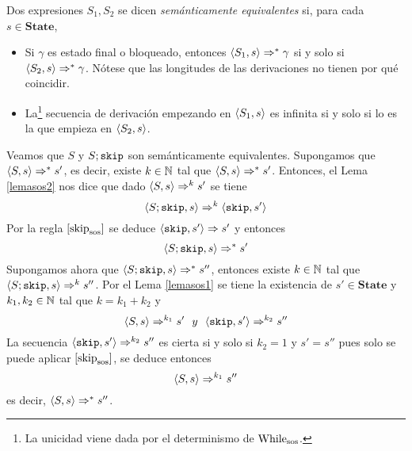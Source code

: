 \begin{definition}
Dos expresiones $S_1, S_2$ se dicen \textit{semánticamente equivalentes} si, para cada $s \in \mathbf{State}$, 
\begin{itemize}
    \item Si $\gamma$ es estado final o bloqueado, entonces $\langle S_1, s \rangle\Rightarrow^* \gamma$ si y solo si $\langle S_2, s \rangle \Rightarrow^*\gamma$. Nótese que las longitudes de las derivaciones no tienen por qué coincidir.
    \item La\footnote{La unicidad viene dada por el determinismo de $\mathrm{While}_{\mathrm{sos}}$.} secuencia de derivación empezando en $\langle S_1, s \rangle$ es infinita si y solo si lo es la que empieza en $\langle S_2, s \rangle$.
\end{itemize} 
\end{definition}

\begin{example}
Veamos que $S$ y $S; \texttt{skip}$ son semánticamente equivalentes. Supongamos que $\langle S, s \rangle\Rightarrow^*s'$, es decir, existe $k\in\mathbb{N}$ tal que $\langle S, s \rangle\Rightarrow^*s'$. Entonces, el Lema \ref{lemasos2} nos dice que dado $\langle S, s \rangle\Rightarrow^k s'$ se tiene
\[
    \langle S; \texttt{skip}, s \rangle\Rightarrow^k \langle  \texttt{skip}, s' \rangle
\]
Por la regla $[\mathrm{skip}_{\mathrm{sos}}]$ se deduce $\langle  \texttt{skip}, s' \rangle \Rightarrow s'$ y entonces
\[
    \langle S;  \texttt{skip}, s \rangle \Rightarrow^* s'
\]
Supongamos ahora que $\langle S; \texttt{skip}, s \rangle\Rightarrow^*s''$, entonces existe $k\in\mathbb{N}$ tal que  $\langle S; \texttt{skip}, s \rangle\Rightarrow^k s''$. Por el Lema \ref{lemasos1} se tiene la existencia de $s'\in\textbf{State}$ y $k_1,k_2\in\mathbb{N}$ tal que $k = k_1 + k_2$ y
\[
    \la{S}{s}\dto^{k_1} s'\ \ y\ \ \la{\n{skip}}{s'}\dto^{k_2} s''
\]
La secuencia $\langle \texttt{skip}, s' \rangle\Rightarrow^{k_2} s''$ es cierta si y solo si $k_2 = 1$ y $s' = s''$ pues solo se puede aplicar $[\mathrm{skip}_{\mathrm{sos}}]$, se deduce entonces
\[
    \langle S, s \rangle\Rightarrow^{k_1} s''
\]
es decir, $\langle S, s \rangle\Rightarrow^{*} s''$.
\end{example}

